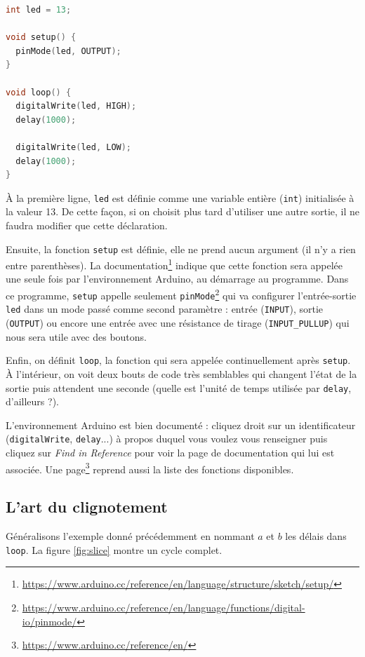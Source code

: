 \documentclass[11pt,a4paper,oneside,twocolumn]{article}
\begin{document}
\begin{lstlisting}[frame=single,language=C++,caption=
Exemple : \texttt{01.Basics/Blink}]
int led = 13;

void setup() {
  pinMode(led, OUTPUT);
}

void loop() {
  digitalWrite(led, HIGH);
  delay(1000);

  digitalWrite(led, LOW);
  delay(1000);
}
\end{lstlisting}

À la première ligne, \texttt{led} est définie comme une variable entière
(\texttt{int}) initialisée à la valeur 13. De cette façon, si on choisit plus
tard d'utiliser une autre sortie, il ne faudra modifier que cette déclaration.

Ensuite, la fonction \texttt{setup} est définie, elle ne prend aucun argument
(il n'y a rien entre parenthèses). La
documentation\footnote{\url{https://www.arduino.cc/reference/en/language/structure/sketch/setup/}}
indique que cette fonction sera appelée une seule fois par l'environnement
Arduino, au démarrage au programme. Dans ce programme, \texttt{setup} appelle
seulement
\texttt{pinMode}\footnote{\url{https://www.arduino.cc/reference/en/language/functions/digital-io/pinmode/}}
qui va configurer l'entrée-sortie \texttt{led} dans un mode passé comme second
paramètre : entrée (\texttt{INPUT}), sortie (\texttt{OUTPUT}) ou encore une
entrée avec une résistance de tirage (\texttt{INPUT\_PULLUP}) qui nous sera
utile avec des boutons.

Enfin, on définit \texttt{loop}, la fonction qui sera appelée continuellement
après \texttt{setup}. À l'intérieur, on voit deux bouts de code très semblables
qui changent l'état de la sortie puis attendent une seconde (quelle est l'unité
de temps utilisée par \texttt{delay}, d'ailleurs ?).

L'environnement Arduino est bien documenté : cliquez droit sur un identificateur
(\texttt{digitalWrite}, \texttt{delay}...) à propos duquel vous voulez vous
renseigner puis cliquez sur \emph{Find in Reference} pour voir la page de
documentation qui lui est associée.
Une page\footnote{\url{https://www.arduino.cc/reference/en/}} reprend aussi la
liste des fonctions disponibles.

\subsection{L'art du clignotement}
Généralisons l'exemple donné précédemment en nommant $a$ et $b$ les délais dans
\texttt{loop}. La figure \ref{fig:slice} montre un cycle complet.
\end{document}
